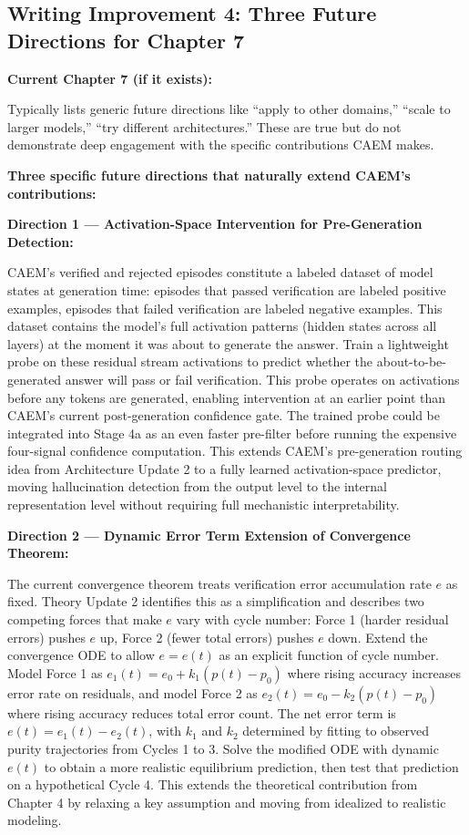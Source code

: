 \documentclass[11pt,a4paper]{article}
\newcommand{\implementbox}[2]{%
\begin{tcolorbox}[enhanced,breakable,
  colback=LightSlate,colframe=Slate,boxrule=1.5pt,arc=4pt,
  left=8pt,right=8pt,top=6pt,bottom=6pt,
  title={\bfseries\small\color{white}#1},
  attach boxed title to top left={yshift=-2mm,xshift=6mm},
  boxed title style={colback=Slate,arc=3pt,boxrule=0pt,
    left=4pt,right=4pt,top=2pt,bottom=2pt}]
#2
\end{tcolorbox}}
\begin{document}
\subsection{Writing Improvement 4: Three Future Directions for Chapter 7}

\implementbox{WRITING IMPROVEMENT 4: Concrete Future Work That Extends Current Contributions}{
\textbf{Current Chapter 7 (if it exists):}

Typically lists generic future directions like ``apply to other domains,'' ``scale to larger models,'' ``try different architectures.'' These are true but do not demonstrate deep engagement with the specific contributions CAEM makes.

\textbf{Three specific future directions that naturally extend CAEM's contributions:}

\textbf{Direction 1 — Activation-Space Intervention for Pre-Generation Detection:}

CAEM's verified and rejected episodes constitute a labeled dataset of model states at generation time: episodes that passed verification are labeled positive examples, episodes that failed verification are labeled negative examples. This dataset contains the model's full activation patterns (hidden states across all layers) at the moment it was about to generate the answer. Train a lightweight probe on these residual stream activations to predict whether the about-to-be-generated answer will pass or fail verification. This probe operates on activations before any tokens are generated, enabling intervention at an earlier point than CAEM's current post-generation confidence gate. The trained probe could be integrated into Stage 4a as an even faster pre-filter before running the expensive four-signal confidence computation. This extends CAEM's pre-generation routing idea from Architecture Update 2 to a fully learned activation-space predictor, moving hallucination detection from the output level to the internal representation level without requiring full mechanistic interpretability.

\textbf{Direction 2 — Dynamic Error Term Extension of Convergence Theorem:}

The current convergence theorem treats verification error accumulation rate $e$ as fixed. Theory Update 2 identifies this as a simplification and describes two competing forces that make $e$ vary with cycle number: Force 1 (harder residual errors) pushes $e$ up, Force 2 (fewer total errors) pushes $e$ down. Extend the convergence ODE to allow $e = e(t)$ as an explicit function of cycle number. Model Force 1 as $e_1(t) = e_0 + k_1(p(t) - p_0)$ where rising accuracy increases error rate on residuals, and model Force 2 as $e_2(t) = e_0 - k_2(p(t) - p_0)$ where rising accuracy reduces total error count. The net error term is $e(t) = e_1(t) - e_2(t)$, with $k_1$ and $k_2$ determined by fitting to observed purity trajectories from Cycles 1 to 3. Solve the modified ODE with dynamic $e(t)$ to obtain a more realistic equilibrium prediction, then test that prediction on a hypothetical Cycle 4. This extends the theoretical contribution from Chapter 4 by relaxing a key assumption and moving from idealized to realistic modeling.

}
\end{document}
